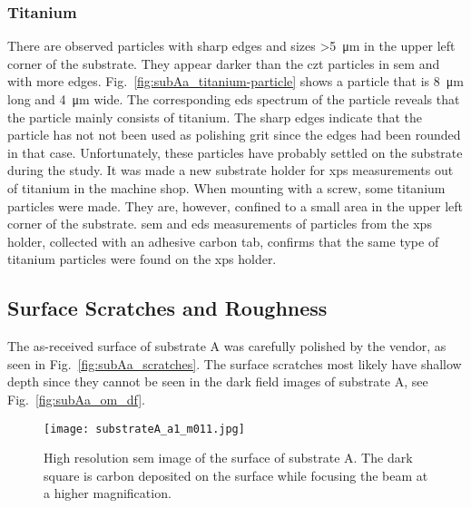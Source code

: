 \subsubsection{Titanium}
There are observed particles with sharp edges and sizes \SI{>5}{\micro\metre} in the upper left corner of the substrate. They appear darker than the \ac{czt} particles in \ac{sem} and with more edges. Fig.~\ref{fig:subAa_titanium-particle} shows a particle that is \SI{8}{\micro\metre} long and \SI{4}{\micro\metre} wide. The corresponding \ac{eds} spectrum of the particle reveals that the particle mainly consists of titanium. The sharp edges indicate that the particle has not not been used as polishing grit since the edges had been rounded in that case. Unfortunately, these particles have probably settled on the substrate during the study. It was made a new substrate holder for \ac{xps} measurements out of titanium in the machine shop. When mounting with a screw, some titanium particles were made. They are, however, confined to a small area in the upper left corner of the substrate. \Ac{sem} and \ac{eds} measurements of particles from the \ac{xps} holder, collected with an adhesive carbon tab, confirms that the same type of titanium particles were found on the \ac{xps} holder. %



\subsection{Surface Scratches and Roughness}
The as-received surface of substrate A was carefully polished by the vendor, as seen in Fig.~\ref{fig:subAa_scratches}. The surface scratches most likely have shallow depth since they cannot be seen in the dark field images of substrate A, see Fig.~\ref{fig:subAa_om_df}.

\begin{figure}[htbp]
    \centering
    \texttt{[image: substrateA\_a1\_m011.jpg]}
    \caption[\Ac{sem} image of surface scratches on substrate A.]{High resolution \ac{sem} image of the surface of substrate A. The dark square is carbon deposited on the surface while focusing the beam at a higher magnification.}\label{fig:subAa_scratches}
    \label{fig:SEM_A_surface}
\end{figure}

